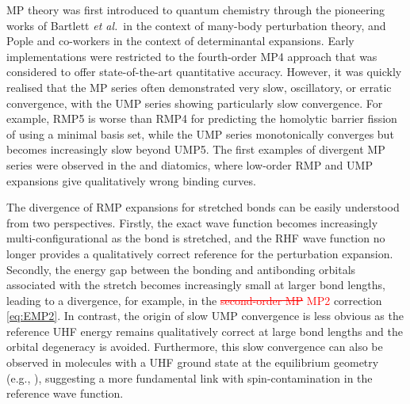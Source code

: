 \documentclass[aps,prb,reprint,noshowkeys,superscriptaddress]{revtex4-1}
\newcommand{\titou}[1]{\textcolor{red}{#1}}
\newcommand{\trash}[1]{\textcolor{red}{\sout{#1}}}
\newcommand{\latin}[1]{#1}
\newcommand{\eg}{\latin{e.g.}}
\newcommand{\etal}{\textit{et al.}}
\begin{document}
MP theory was first introduced to quantum chemistry through the pioneering
works of Bartlett \etal\ in the context of many-body perturbation theory,\cite{Bartlett_1975}
and Pople and co-workers in the context of determinantal expansions.\cite{Pople_1976,Pople_1978}
Early implementations were restricted to the fourth-order MP4 approach that was considered
to offer state-of-the-art quantitative accuracy.\cite{Pople_1978,Krishnan_1980}
However, it was quickly realised that the MP series often demonstrated very slow, oscillatory, 
or erratic convergence, with the UMP series showing particularly slow convergence.\cite{Laidig_1985,Knowles_1985,Handy_1985}
For example, RMP5 is worse than RMP4 for predicting the homolytic barrier fission of  using a minimal basis set, 
while the UMP series monotonically converges but becomes increasingly slow beyond UMP5.\cite{Gill_1986}
The first examples of divergent MP series were observed in the  and  
diatomics, where low-order RMP and UMP expansions give qualitatively wrong binding curves.\cite{Laidig_1987} 

The divergence of RMP expansions for stretched bonds can be easily understood from two perspectives.\cite{Gill_1988a}
Firstly, the exact wave function becomes increasingly multi-configurational as the bond is stretched, and the 
RHF wave function no longer provides a qualitatively correct reference for the perturbation expansion.
Secondly, the energy gap between the bonding and antibonding orbitals associated with the stretch becomes
increasingly small at larger bond lengths, leading to a divergence, for example, in the \trash{second-order MP} \titou{MP2} correction \eqref{eq:EMP2}.
In contrast, the origin of slow UMP convergence is less obvious as the reference UHF energy remains
qualitatively correct at large bond lengths and the orbital degeneracy is avoided.
Furthermore, this slow convergence can also be observed in molecules with a UHF ground state at the equilibrium
geometry (\eg, ), suggesting a more fundamental link with spin-contamination 
in the reference wave function.\cite{Nobes_1987}
\end{document}

